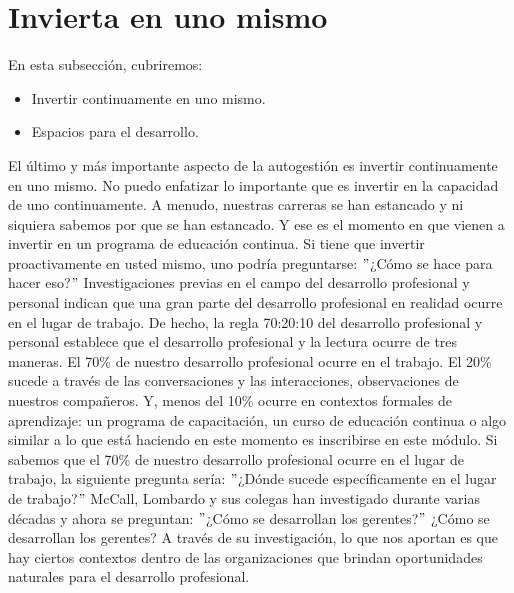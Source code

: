 \documentclass[10pt]{book}
\begin{document}
\section{Invierta en uno mismo}
En esta subsección, cubriremos:
\begin{itemize}
\item Invertir continuamente en uno mismo.
\item Espacios para el desarrollo.
\end{itemize}
El último y más importante aspecto de la autogestión es invertir continuamente en uno mismo. No puedo enfatizar lo importante que es invertir en la capacidad de uno continuamente.  A menudo, nuestras carreras se han estancado y ni siquiera sabemos por que se han estancado. Y ese es el momento en que vienen a invertir en un programa de educación continua. Si  tiene que invertir proactivamente en usted mismo, uno podría preguntarse: $"$¿Cómo se hace para hacer eso?$"$ Investigaciones previas en el campo del desarrollo profesional y personal indican que una gran parte del desarrollo profesional en realidad ocurre en el lugar de trabajo. De hecho, la regla 70:20:10 del desarrollo profesional y personal establece que el desarrollo profesional y la lectura ocurre de tres maneras. El 70\% de nuestro desarrollo profesional ocurre en el trabajo. El 20\% sucede a través de las conversaciones y las interacciones, observaciones de nuestros compañeros. Y, menos del 10\% ocurre en contextos formales de aprendizaje: un programa de capacitación, un curso de educación continua o algo similar a lo que está haciendo en este momento es inscribirse en este módulo. Si sabemos que el 70\% de nuestro desarrollo profesional ocurre en el lugar de trabajo, la siguiente pregunta sería: $"$¿Dónde sucede específicamente en el lugar de trabajo?$"$ McCall, Lombardo y sus colegas han investigado durante varias décadas y ahora se preguntan: $"$¿Cómo se desarrollan los gerentes?$"$ ¿Cómo se desarrollan los gerentes? A través de su investigación, lo que nos aportan es que hay ciertos contextos dentro de las organizaciones que brindan oportunidades naturales para el desarrollo profesional.
\end{document}
